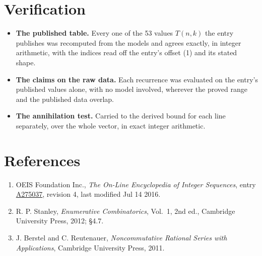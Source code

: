 \documentclass[11pt]{article}
\theoremstyle{definition}
\begin{document}
\section{Verification}

\begin{itemize}

\item {\bfseries The published table.} Every one of the 53 values $T(n,k)$ the entry publishes was recomputed from the models and agrees exactly, in integer arithmetic, with the indices read off the entry's offset (1) and its stated shape.

\item {\bfseries The claims on the raw data.} Each recurrence was evaluated on the entry's published values alone, with no model involved, wherever the proved range and the published data overlap.

\item {\bfseries The annihilation test.} Carried to the derived bound for each line separately, over the whole vector, in exact integer arithmetic.

\end{itemize}

\section{References}

\begin{enumerate}

\item OEIS Foundation Inc., \emph{The On-Line Encyclopedia of Integer Sequences}, entry \href{https://oeis.org/A275037}{A275037}, revision 4, last modified Jul 14 2016.

\item R. P. Stanley, \emph{Enumerative Combinatorics}, Vol.~1, 2nd ed., Cambridge University Press, 2012; \S4.7.

\item J. Berstel and C. Reutenauer, \emph{Noncommutative Rational Series with Applications}, Cambridge University Press, 2011.

\end{enumerate}
\end{document}
